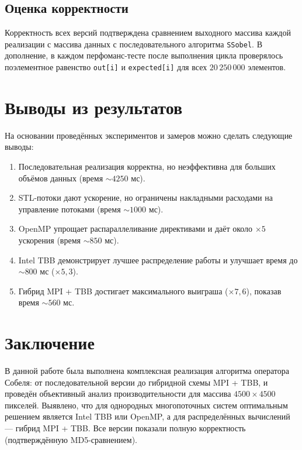 \documentclass[12pt]{article}
\begin{document}
\subsection{Оценка корректности}

Корректность всех версий подтверждена сравнением выходного массива каждой реализации с массива данных с последовательного алгоритма \texttt{SSobel}. В дополнение, в каждом перфоманс-тесте после выполнения цикла проверялось поэлементное равенство \texttt{out[i]} и \texttt{expected[i]} для всех $20\,250\,000$ элементов.


\section{Выводы из результатов}

На основании проведённых экспериментов и замеров можно сделать следующие выводы:
\begin{enumerate}
    \item Последовательная реализация корректна, но неэффективна для больших объёмов данных (время $\sim 4250$ мс).
    \item STL-потоки дают ускорение, но ограничены накладными расходами на управление потоками (время $\sim 1000$ мс).
    \item OpenMP упрощает распараллеливание директивами и даёт около $\times 5$ ускорения (время $\sim 850$ мс).
    \item Intel TBB демонстрирует лучшее распределение работы и улучшает время до $\sim 800$ мс ($\times 5{,}3$).
    \item Гибрид MPI + TBB достигает максимального выиграша ($\times 7{,}6$), показав время $\sim 560$ мс.
\end{enumerate}


\section{Заключение}

В данной работе была выполнена комплексная реализация алгоритма оператора Собеля: от последовательной версии до гибридной схемы MPI + TBB, и проведён объективный анализ производительности для массива $4500\times4500$ пикселей. Выявлено, что для однородных многопоточных систем оптимальным решением является Intel TBB или OpenMP, а для распределённых вычислений — гибрид MPI + TBB. Все версии показали полную корректность (подтверждённую MD5-сравнением).
\end{document}
